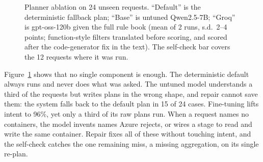 \documentclass[runningheads]{llncs}
\begin{document}
\begin{figure}[t]
\centering
{}
\caption{Planner ablation on 24 unseen requests. ``Default'' is the deterministic fallback plan;
``Base'' is untuned Qwen2.5-7B; ``Groq'' is gpt-oss-120b given the full rule book (mean of 2
runs, s.d.\ 2--4 points; function-style filters translated before scoring, and scored after the
code-generator fix in the text). The self-check bar
covers the 12 requests where it was run.}
\label{fig:planner}
\end{figure}

Figure~\ref{fig:planner} shows that no single component is enough. The deterministic default
always runs and never does what was asked. The untuned model understands a third of the requests
but writes plans in the wrong shape, and repair cannot save them: the system falls back to the
default plan in 15 of 24 cases. Fine-tuning lifts intent to 96\%, yet only a third of its raw plans
run. When a request names no containers, the model invents names Azure rejects, or wires a stage to
read and write the same container. Repair fixes all of these without touching intent, and the
self-check catches the one remaining miss, a missing aggregation, on its single re-plan.
\end{document}
